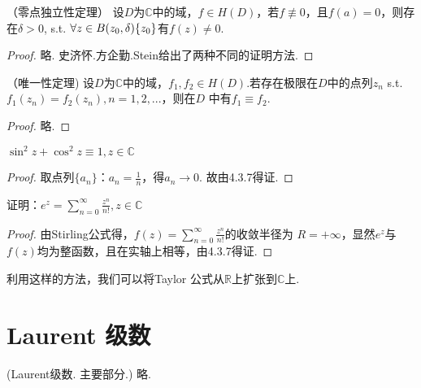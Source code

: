 \begin{theorem}\color{blue}（零点独立性定理）
	\color{black}
	设$\displaystyle{D}$为$\displaystyle{\mathbb{C}}$中的域，$\displaystyle{f \in H(D)}$，若$\displaystyle{f \not\equiv 0}$，且$\displaystyle{f(a)=0}$，则存在$\displaystyle{\delta > 0}$, s.t. $\displaystyle{\forall z \in B(z_0, \delta) \\ \{z_0\}}$有$\displaystyle{f(z) \neq 0}$.
\end{theorem}
\begin{proof}
	略. 史济怀.方企勤.Stein给出了两种不同的证明方法.
\end{proof}


\begin{theorem}\color{blue}（唯一性定理)
	\color{black}
	设$\displaystyle{D}$为$\displaystyle{\mathbb{C}}$中的域，$\displaystyle{f_1,f_2 \in H(D)}$.若存在极限在$\displaystyle{D}$中的点列$\displaystyle{z_n}$ s.t. $\displaystyle{f_1(z_n) = f_2(z_n), n=1,2,...}$，则在$\displaystyle{D}$ 中有$\displaystyle{f_1 \equiv f_2}$.
	
\end{theorem}
\begin{proof}
	略.
\end{proof}


\begin{eg} 
	\color{blue} $\displaystyle{{\sin}^2 z + \cos^2 z \equiv 1, z \in \mathbb{C}}$
	\color{black}
\end{eg}
\begin{proof}
	取点列$\displaystyle{\{a_n\}}$：$\displaystyle{a_n = \frac{1}{n}}$，得$\displaystyle{a_n \rightarrow 0}$. 故由4.3.7得证.
\end{proof}

\begin{eg}
	\color{blue}
	证明：$\displaystyle{e^z =\sum_{n=0}^{\infty} \frac{z^n}{n!}, z \in \mathbb{C}}$
	\color{black}
\end{eg}
\begin{proof}
	由Stirling公式得，$\displaystyle{f(z)=\sum_{n=0}^{\infty} \frac{z^n}{n!}}$的收敛半径为 $\displaystyle{R=+\infty}$，显然$\displaystyle{e^z}$与$\displaystyle{f(z)}$均为整函数，且在实轴上相等，由4.3.7得证.
\end{proof}
利用这样的方法，我们可以将{\rm Taylor }公式从$\displaystyle{\mathbb{R}}$上扩张到$\displaystyle{\mathbb{C}}$上.

\section{{\rm Laurent } 级数}
\begin{theorem}({\rm Laurent}级数. 主要部分.)
	略.
\end{theorem}

